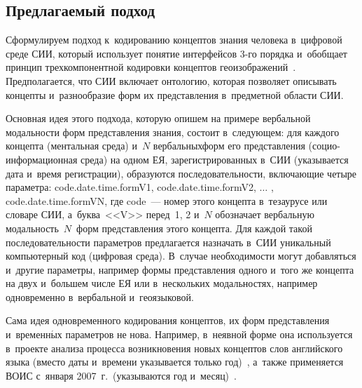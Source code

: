 \begin{multicols}{2}
\section{Предлагаемый подход}

  Сформулируем подход к~кодированию концептов знания человека 
в~цифровой среде СИИ, который использует понятие интерфейсов 3-го 
порядка и~обобщает принцип трехкомпонентной кодировки концептов 
геоизображений~\cite{28-zac, 29-zac}. Предполагается, что СИИ включает 
онтологию, которая позволяет описывать концепты и~разнообразие форм их 
представления в~предметной области СИИ.
  
  Основная идея этого подхода, которую опишем на примере вербальной 
модальности форм пред\-став\-ле\-ния знания, состоит в~следующем: для каж\-до\-го 
концепта (ментальная среда) и~$N$ вербаль\-ных\linebreak форм его представления 
(со\-цио-ин\-фор\-ма\-ци\-он\-ная среда) на одном ЕЯ, зарегистрированных в~СИИ 
(указывается дата и~время регистрации), образуются последовательности, 
вклю\-ча\-ющие четыре па\-ра\-мет\-ра: code.date.time.formV1, code.date.time.formV2, 
$\ldots$ ,  code.date.time.formVN, где code~--- номер этого концепта в~тезаурусе 
или словаре СИИ, а~бук\-ва~<<V>> перед~1, 2 и~$N$ обозначает вербальную 
модальность~$N$~форм пред\-став\-ле\-ния этого концепта. Для каждой такой 
по\-сле\-до\-ва\-тель\-ности па\-ра\-мет\-ров предлагается назначать в~СИИ уникальный 
компьютерный код (циф\-ро\-вая среда). В~случае необходимости могут 
добавляться и~другие па\-ра\-мет\-ры, например формы пред\-став\-ле\-ния одного 
и~того же концепта на двух и~большем чис\-ле ЕЯ или в~нескольких 
модальностях, например одновременно в~вербальной и~геоязыковой.
  
  Сама идея одновременного кодирования концептов, их форм представления 
и~временн$\acute{\mbox{ы}}$х параметров не нова. Например, в~неявной 
форме она используется в~проекте анализа процесса возникновения новых 
концептов слов английского языка (вместо даты и~времени указывается только 
год)~\cite{24-zac}, а~также применяется ВОИС с~января 2007~г.\ (указываются 
год и~месяц)~\cite{1-zac}.
  

\end{multicols}
